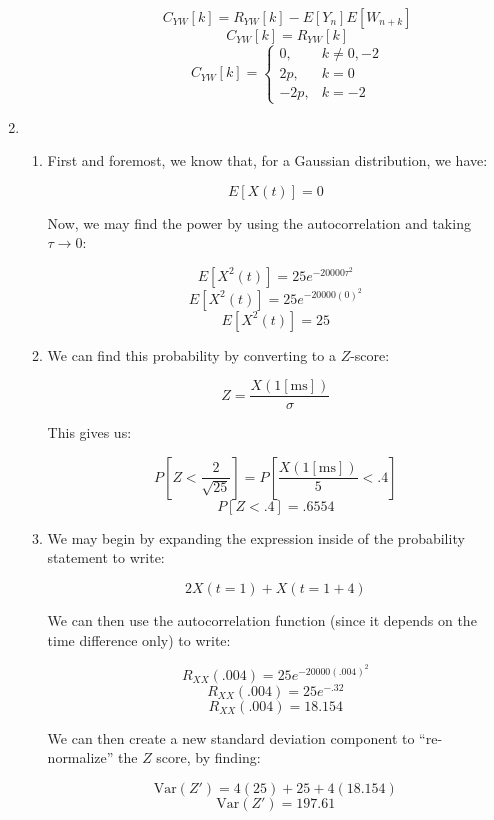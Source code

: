 \begin{enumerate}
\begin{enumerate}
\begin{enumerate}
            $$C_{YW}[k]=R_{YW}[k]-E[Y_n]E[W_{n+k}]$$
            $$C_{YW}[k]=R_{YW}[k]$$
            $$\boxed{C_{YW}[k]=\left\{\begin{array}{ll} 0, & k\neq0,-2\\ 2p, & k=0\\-2p, & k=-2\end{array}}$$

        \end{enumerate}

    \end{enumerate}

  \item

    \begin{enumerate}

      \item First and foremost, we know that, for a Gaussian distribution, we have:

        $$\boxed{E[X(t)]=0}$$

        Now, we may find the power by using the autocorrelation and taking $\tau\to0$:

        $$E[X^2(t)]=25e^{-20000\tau^2}$$
        $$E[X^2(t)]=25e^{-20000(0)^2}$$
        $$\boxed{E[X^2(t)]=25}$$

      \item We can find this probability by converting to a $Z$-score:

        $$Z=\frac{X(1[\si{\milli\second}])}{\sigma}$$

        This gives us:

        $$P\left[ Z<\frac{2}{\sqrt{25}} \right]=P\left[\frac{X(1[\si{\milli\second}])}{5}<.4\right]$$
        $$\boxed{P\left[ Z<.4 \right]=.6554}$$

      \item We may begin by expanding the expression inside of the probability statement to write:

        $$2X(t=1)+X(t=1+4)$$

        We can then use the autocorrelation function (since it depends on the time difference only) to write:

        $$R_{XX}(.004)=25e^{-20000(.004)^2}$$
        $$R_{XX}(.004)=25e^{-.32}$$
        $$R_{XX}(.004)=18.154$$

        We can then create a new standard deviation component to ``re-normalize'' the $Z$ score, by finding:

        $$\text{Var}(Z')=4(25)+25+4(18.154)$$
        $$\text{Var}(Z')=197.61$$


\end{enumerate}
\end{enumerate}
